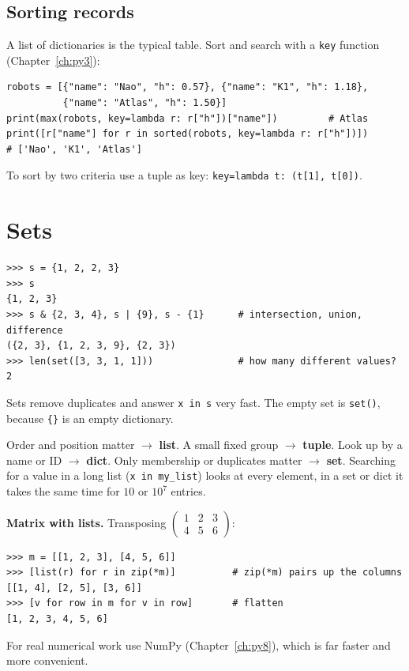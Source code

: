 \subsection*{Sorting records}
A list of dictionaries is the typical table. Sort and search with a \texttt{key} function (Chapter~\ref{ch:py3}):
\begin{verbatim}
robots = [{"name": "Nao", "h": 0.57}, {"name": "K1", "h": 1.18},
          {"name": "Atlas", "h": 1.50}]
print(max(robots, key=lambda r: r["h"])["name"])         # Atlas
print([r["name"] for r in sorted(robots, key=lambda r: r["h"])])
# ['Nao', 'K1', 'Atlas']
\end{verbatim}
To sort by two criteria use a tuple as key: \verb!key=lambda t: (t[1], t[0])!.

\section*{Sets}
\begin{verbatim}
>>> s = {1, 2, 2, 3}
>>> s
{1, 2, 3}
>>> s & {2, 3, 4}, s | {9}, s - {1}      # intersection, union, difference
({2, 3}, {1, 2, 3, 9}, {2, 3})
>>> len(set([3, 3, 1, 1]))               # how many different values?
2
\end{verbatim}
Sets remove duplicates and answer \verb!x in s! very fast. The empty set is \texttt{set()}, because \verb!{}! is an empty dictionary.

\begin{keyidea}
Order and position matter $\to$ \textbf{list}. A small fixed group $\to$ \textbf{tuple}. Look up by a name or ID $\to$ \textbf{dict}. Only membership or duplicates matter $\to$ \textbf{set}. Searching for a value in a long list (\verb!x in my_list!) looks at every element, in a set or dict it takes the same time for $10$ or $10^7$ entries.
\end{keyidea}

\begin{example}
\textbf{Matrix with lists.} Transposing $\begin{pmatrix}1&2&3\\4&5&6\end{pmatrix}$:
\begin{verbatim}
>>> m = [[1, 2, 3], [4, 5, 6]]
>>> [list(r) for r in zip(*m)]          # zip(*m) pairs up the columns
[[1, 4], [2, 5], [3, 6]]
>>> [v for row in m for v in row]       # flatten
[1, 2, 3, 4, 5, 6]
\end{verbatim}
For real numerical work use NumPy (Chapter~\ref{ch:py8}), which is far faster and more convenient.
\end{example}

